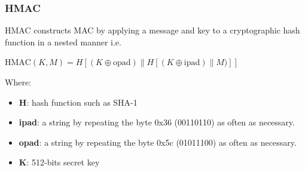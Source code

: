 \documentclass{article}
\begin{document}
\subsubsection{HMAC}
HMAC constructs MAC by applying a message and key to a cryptographic hash function in a nested manner i.e.
\begin{center}
  $\text{HMAC}(K, M) = H[(K \oplus \text{opad}) \| H[(K \oplus \text{ipad}) \| M)]]$
\end{center}
Where:
\begin{itemize}
  \item \textbf{H}: hash function such as SHA-1
  \item \textbf{ipad}: a string by repeating the byte 0x36 (00110110) as often as necessary.
  \item \textbf{opad}: a string by repeating the byte 0x5c (01011100) as often as necessary.
  \item \textbf{K}: 512-bits secret key 
\end{itemize}
\end{document}
